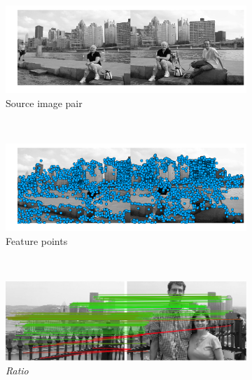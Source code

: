 \begin{figure}[h]
	\centering%
		\begin{subfigure}[t]{0.5\columnwidth}
			\centering
			\includegraphics[width=0.95\columnwidth]{images/MMC_pitts_source}
			\caption{Source image pair}
			\label{fig:pitts_source}
		\end{subfigure}%
		~ %
		\begin{subfigure}[t]{0.5\columnwidth}
			\centering
			\includegraphics[width=0.95\columnwidth]{images/MMC_pitts_keypoints}
			\caption{Feature points}
			\label{fig:pitts_keypoints}
		\end{subfigure}%
		\\ %
		\begin{subfigure}[t]{0.5\columnwidth}
			\centering
			\includegraphics[width=0.95\columnwidth]{images/mirror_match_off}
			\caption{\emph{Ratio}}
			\label{fig:unique}
		\end{subfigure}%
		~ %
		\begin{subfigure}[t]{0.5\columnwidth}
			\centering

\end{subfigure}
\end{figure}
